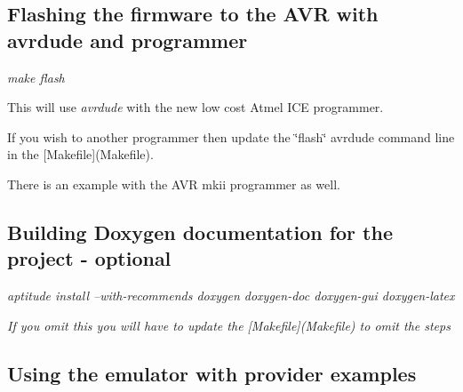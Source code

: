 \subsection*{Flashing the firmware to the A\+VR with avrdude and programmer}


\begin{DoxyItemize}
\item {\itshape make flash}
\begin{DoxyItemize}
\item This will use {\itshape avrdude} with the new low cost Atmel I\+CE programmer.
\begin{DoxyItemize}
\item If you wish to another programmer then update the \char`\"{}flash\char`\"{} avrdude command line in the \mbox{[}Makefile\mbox{]}(Makefile).
\item There is an example with the A\+VR mkii programmer as well.
\end{DoxyItemize}
\end{DoxyItemize}
\end{DoxyItemize}

\subsection*{Building Doxygen documentation for the project -\/ optional}


\begin{DoxyItemize}
\item {\itshape aptitude install --with-\/recommends doxygen doxygen-\/doc doxygen-\/gui doxygen-\/latex}
\item {\itshape If you omit this you will have to update the \mbox{[}Makefile\mbox{]}(Makefile) to omit the steps} 


\end{DoxyItemize}

\subsection*{Using the emulator with provider examples}


